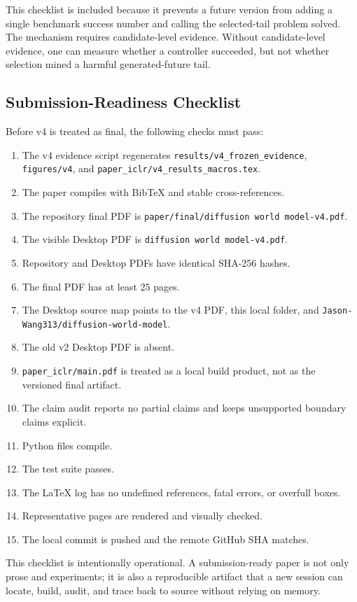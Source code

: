 \documentclass{article}
\begin{document}
This checklist is included because it prevents a future version from adding a
single benchmark success number and calling the selected-tail problem solved.
The mechanism requires candidate-level evidence. Without candidate-level
evidence, one can measure whether a controller succeeded, but not whether
selection mined a harmful generated-future tail.

\subsection{Submission-Readiness Checklist}
\label{app:v4-submission-checklist}

Before v4 is treated as final, the following checks must pass:
\begin{enumerate}
\item The v4 evidence script regenerates
\texttt{results/v4\_frozen\_evidence}, \texttt{figures/v4}, and
\texttt{paper\_iclr/v4\_results\_macros.tex}.
\item The paper compiles with BibTeX and stable cross-references.
\item The repository final PDF is
\texttt{paper/final/diffusion world model-v4.pdf}.
\item The visible Desktop PDF is \texttt{diffusion world model-v4.pdf}.
\item Repository and Desktop PDFs have identical SHA-256 hashes.
\item The final PDF has at least $25$ pages.
\item The Desktop source map points to the v4 PDF, this local folder, and
\texttt{Jason-Wang313/diffusion-world-model}.
\item The old v2 Desktop PDF is absent.
\item \texttt{paper\_iclr/main.pdf} is treated as a local build product, not
as the versioned final artifact.
\item The claim audit reports no partial claims and keeps unsupported
boundary claims explicit.
\item Python files compile.
\item The test suite passes.
\item The LaTeX log has no undefined references, fatal errors, or overfull
boxes.
\item Representative pages are rendered and visually checked.
\item The local commit is pushed and the remote GitHub SHA matches.
\end{enumerate}

This checklist is intentionally operational. A submission-ready paper is not
only prose and experiments; it is also a reproducible artifact that a new
session can locate, build, audit, and trace back to source without relying on
memory.
\end{document}
